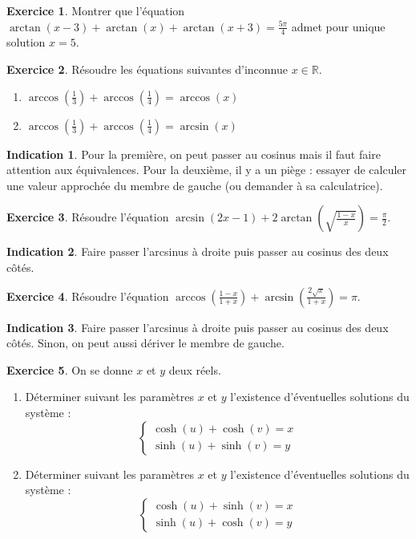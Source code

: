 \documentclass[french]{book}
\newcommand{\R}{\mathbb{R}}
\theoremstyle{definition}
\newtheorem{ex}{Exercice}[chapter]
\theoremstyle{theorem}
\newtheorem*{ind}{Indication}
\theoremstyle{remark}
\begin{document}
\begin{ex}
	Montrer que l'équation $\arctan(x-3)+\arctan(x)+\arctan(x+3)=\displaystyle\frac{5\pi}{4}$ admet pour unique solution $x=5$.
\end{ex}

\begin{ex}
	Résoudre les équations suivantes d'inconnue $x\in\R$.
	\begin{enumerate}
		\item $\displaystyle\arccos\left(\frac{1}{3}\right)+\arccos\left(\frac{1}{4}\right)=\arccos(x)$
		\item $\displaystyle\arccos\left(\frac{1}{3}\right)+\arccos\left(\frac{1}{4}\right)=\arcsin(x)$
	\end{enumerate}
\end{ex}

\begin{ind}
	Pour la première, on peut passer au cosinus mais il faut faire attention aux équivalences. Pour la deuxième, il y a un piège : essayer de calculer une valeur approchée du membre de gauche (ou demander à sa calculatrice).
\end{ind}

\begin{ex}
	Résoudre l'équation $\arcsin(2x-1)+2\arctan\displaystyle\left(\sqrt{\frac{1-x}{x}}\right)=\frac{\pi}{2}$.
\end{ex}

\begin{ind}
	Faire passer l'arcsinus à droite puis passer au cosinus des deux côtés.
\end{ind}

\begin{ex}
	Résoudre l'équation $\displaystyle\arccos\left(\frac{1-x}{1+x}\right)+\arcsin\left(\frac{2\sqrt{x}}{1+x}\right)=\pi$.
\end{ex}

\begin{ind}
	Faire passer l'arcsinus à droite puis passer au cosinus des deux côtés. Sinon, on peut aussi dériver le membre de gauche.
\end{ind}

\begin{ex}
	On se donne $x$ et $y$ deux réels.
	\begin{enumerate}
		\item Déterminer suivant les paramètres $x$ et $y$ l'existence d'éventuelles solutions du système : $$\begin{cases}
			\cosh(u)+\cosh(v)=x \\
			\sinh(u)+\sinh(v)=y
		\end{cases}$$
		\item Déterminer suivant les paramètres $x$ et $y$ l'existence d'éventuelles solutions du système : $$\begin{cases}
			\cosh(u)+\sinh(v)=x \\
			\sinh(u)+\cosh(v)=y
		\end{cases}$$
	\end{enumerate}
\end{ex}
\end{document}
